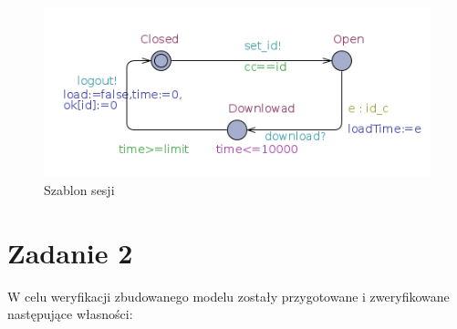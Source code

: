 \documentclass{article}
\begin{document}
		\begin{figure}[h]
			\includegraphics[width=\textwidth]{lab23/session}
			\caption{Szablon sesji}
			\label{figure:session}
		\end{figure}
	
	\newpage
	\section{Zadanie 2}
	
		W celu weryfikacji zbudowanego modelu zostały przygotowane i zweryfikowane następujące własności:
		
\end{document}
